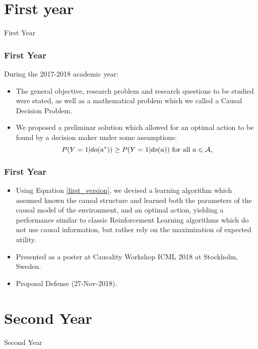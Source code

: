 \documentclass{beamer}
\theoremstyle{plain}
\begin{document}
\section{First year}
\begin{frame}
\begin{center}
\LARGE{First Year}
\end{center}
\end{frame}

\begin{frame}
\frametitle{First Year}
During the 2017-2018 academic year:
\begin{itemize}
\item The general objective, research problem and research questions to be studied were stated, as well as a mathematical problem which we called a Causal Decision Problem.
\item We proposed a preliminar solution which allowed for an optimal action to be found by a decision maker under some assumptions:
\begin{equation}{\label{first_version}}
P(Y=1 | do(a^\ast)) \geq P(Y=1 | do(a)) \textrm{ for all } a \in \mathcal{A},
\end{equation}
\end{itemize}
\end{frame}

\begin{frame}
\frametitle{First Year}
\begin{itemize}
\item Using Equation \ref{first_version}, we devised a learning algorithm which assumed known the causal structure and learned both the parameters of the causal model of the environment, and an optimal action, yielding a performance similar to classic Reinforcement Learning algorithms which do not use causal information, but rather rely on the maximization of expected utility.
\item \cite{gonzalez2018playing} Presented as a poster at Causality Workshop ICML 2018 at Stockholm, Sweden.
\item Proposal Defense (27-Nov-2018).
\end{itemize}
\end{frame}

\section{Second Year}
\begin{frame}
\begin{center}
\LARGE{Second Year}
\end{center}
\end{frame}
\end{document}
